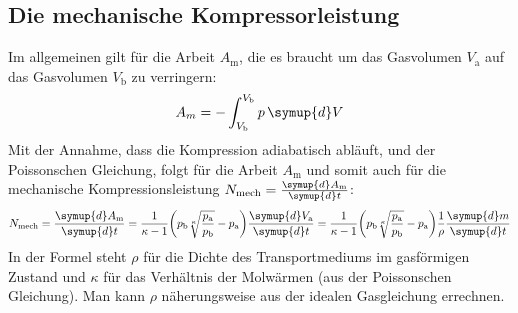 \subsection{Die mechanische Kompressorleistung}
Im allgemeinen gilt für die Arbeit $A_{\text{m}}$, die es braucht um das Gasvolumen $V_{\text{a}}$ auf das Gasvolumen $V_{\text{b}}$ zu verringern: 
\begin{equation*}
    A_m = - \int_{V_{\text{b}}}^{V_{\text{b}}} p\, \symup{d}V
\end{equation*}
Mit der Annahme, dass die Kompression adiabatisch abläuft, und der Poissonschen Gleichung, folgt für die Arbeit $A_{\text{m}}$ und somit auch für die mechanische Kompressionsleistung $N_{\text{mech}} = \frac{\symup{d}A_{\text{m}}}{\symup{d}t}$:
\begin{equation} \label{eqn:kompressorleistung}
    N_{\text{mech}} = \frac{\symup{d}A_{\text{m}}}{\symup{d}t} 
    = \frac{1}{\kappa - 1} \biggl( p_{\text{b}} \sqrt[\kappa]{\frac{p_{\text{a}}}{p_{\text{b}}}} - p_{\text{a}} \biggr) \frac{\symup{d}V_{\text{a}}}{\symup{d}t}
    = \frac{1}{\kappa -1} \biggl( p_{\text{b}} \sqrt[\kappa]{\frac{p_{\text{a}}}{p_{\text{b}}}} - p_{\text{a}} \biggr) \frac{1}{\rho} \frac{\symup{d}m}{\symup{d}t}
\end{equation}
In der Formel steht $\rho$ für die Dichte des Transportmediums im gasförmigen Zustand und $\kappa$ für das Verhältnis der Molwärmen (aus der Poissonschen Gleichung).
Man kann $\rho$ näherungsweise aus der idealen Gasgleichung errechnen.